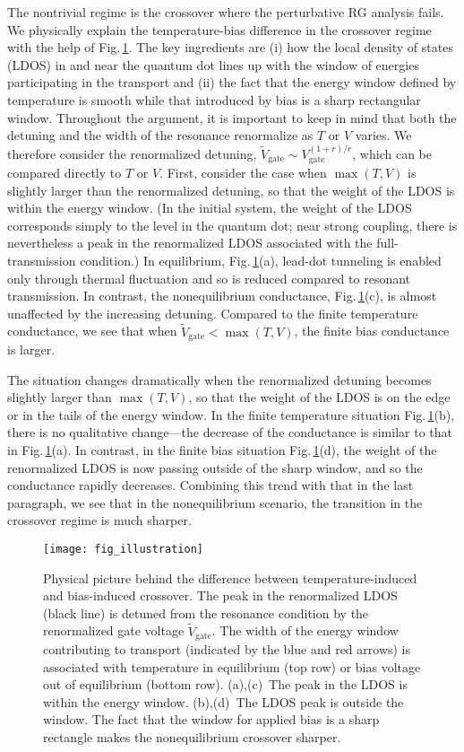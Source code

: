 \documentclass[aps,prb,reprint,floatfix,superscriptaddress,amssymb,amsmath]{revtex4-2}
\newcommand{\Vg}{V_\text{gate}}
\begin{document}
The nontrivial regime is the crossover where
the perturbative RG analysis fails. 
We physically explain the temperature-bias difference in the crossover regime with the help of Fig.\,\ref{fig:illustration}.
The key ingredients are (i) how the local density of states (LDOS) in and near the quantum dot lines up with the window of energies participating in the transport and (ii) the fact that the energy window defined by temperature is smooth while that introduced by bias is a sharp rectangular window. 
Throughout the argument, it is important to keep in mind that both the detuning and the width of the resonance renormalize as $T$ or $V$ varies. We therefore consider the renormalized detuning, $\tilde{V}_\text{gate} \sim \Vg^{(1+r)/r}$, which can be compared directly to $T$ or $V$.  
First, consider the case when $\max(T,V)$ is slightly larger than the renormalized detuning, so that the weight of the LDOS is within the energy window. (In the initial system, the weight of the LDOS corresponds simply to the level in the quantum dot; near strong coupling, there is nevertheless a peak in the renormalized LDOS associated with the full-transmission condition.) In equilibrium, Fig.\,\ref{fig:illustration}(a), lead-dot tunneling is enabled only through thermal fluctuation and so is reduced compared to resonant transmission. 
In contrast, the nonequilibrium conductance, Fig.\,\ref{fig:illustration}(c), is almost unaffected by the increasing detuning. 
Compared to the finite temperature conductance, we see that when $\tilde{V}_{\text{gate}} \!<\! \max(T,V)$, the finite bias conductance is larger. 

The situation changes dramatically when the renormalized detuning becomes slightly larger than $\max(T,V)$, so that the weight of the LDOS is on the edge or in the tails of the energy window.
In the finite temperature situation Fig.\,\ref{fig:illustration}(b), there is no qualitative change---the decrease of the conductance is  similar to that in Fig.\,\ref{fig:illustration}(a).
In contrast, in the finite bias situation Fig.\,\ref{fig:illustration}(d), the weight of the renormalized LDOS is now passing outside of the sharp window, and so the conductance rapidly decreases. 
Combining this trend with that in the last paragraph, we see that in the nonequilibrium scenario, the transition in the crossover regime is much sharper.


\begin{figure}
\texttt{[image: fig\_illustration]}
\caption{\label{fig:illustration}
Physical picture behind the difference between temperature-induced and bias-induced crossover. The peak in the renormalized LDOS (black line) is detuned from the resonance condition by the renormalized gate voltage $\tilde{V}_\text{gate}$. The width of the energy window contributing to transport (indicated by the blue and red arrows) is associated with temperature in equilibrium (top row) or bias voltage out of equilibrium (bottom row).  
(a),(c)~The peak in the LDOS is within the energy window. (b),(d)~The LDOS peak is outside the window. The fact that the window for applied bias is a sharp rectangle makes the nonequilibrium crossover sharper. 
}
\end{figure}
\end{document}
